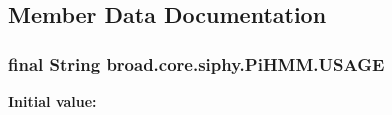 \subsection{Member Data Documentation}
\hypertarget{classbroad_1_1core_1_1siphy_1_1_pi_h_m_m_af8b0ce41f8c843fc6cb6afbe63643953}{
\subsubsection[{U\+S\+A\+G\+E}]{\setlength{\rightskip}{0pt plus 5cm}final String broad.\+core.\+siphy.\+Pi\+H\+M\+M.\+U\+S\+A\+G\+E\hspace{0.3cm}{\ttfamily [static]}}}\label{classbroad_1_1core_1_1siphy_1_1_pi_h_m_m_af8b0ce41f8c843fc6cb6afbe63643953}
{\bfseries Initial value\+:}
